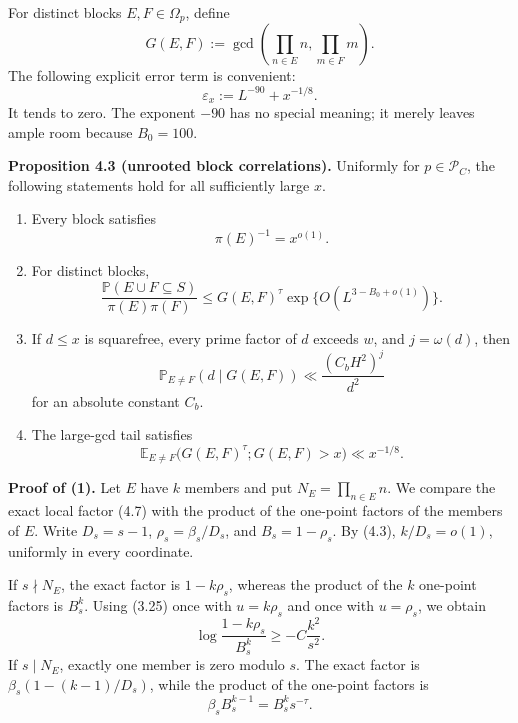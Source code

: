 \documentclass[10pt,letterpaper]{article}
\newcommand{\PP}{\mathbb{P}}
\newcommand{\EE}{\mathbb{E}}
\newcommand{\PC}{\mathcal{P}_C}
\begin{document}
For distinct blocks $E,F\in\Omega_p$, define
\begin{equation}
G(E,F):=\gcd\left(\prod_{n\in E}n,\prod_{m\in F}m\right).
\tag{4.8}
\end{equation}
The following explicit error term is convenient:
\begin{equation}
\varepsilon_x:=L^{-90}+x^{-1/8}.
\tag{4.9}
\end{equation}
It tends to zero. The exponent $-90$ has no special meaning; it merely leaves ample room because $B_0=100$.

\textbf{Proposition 4.3 (unrooted block correlations).} Uniformly for $p\in\PC$, the following statements hold for
all sufficiently large $x$.
\begin{enumerate}
\item Every block satisfies
\begin{equation}
\pi(E)^{-1}=x^{o(1)}.
\tag{4.10}
\end{equation}
\item For distinct blocks,
\begin{equation}
\frac{\PP(E\cup F\subseteq S)}{\pi(E)\pi(F)}
\le G(E,F)^\tau\exp\{O(L^{3-B_0+o(1)})\}.
\tag{4.11}
\end{equation}
\item If $d\le x$ is squarefree, every prime factor of $d$ exceeds $w$, and $j=\omega(d)$, then
\begin{equation}
\PP_{E\ne F}(d\mid G(E,F))\ll\frac{(C_bH^2)^j}{d^2}
\tag{4.12}
\end{equation}
for an absolute constant $C_b$.
\item The large-gcd tail satisfies
\begin{equation}
\EE_{E\ne F}\bigl(G(E,F)^\tau;G(E,F)>x\bigr)\ll x^{-1/8}.
\tag{4.13}
\end{equation}
\end{enumerate}
\textbf{Proof of (1).} Let $E$ have $k$ members and put $N_E=\prod_{n\in E}n$. We compare the exact local factor (4.7) with
the product of the one-point factors of the members of $E$. Write $D_s=s-1$, $\rho_s=\beta_s/D_s$, and $B_s=1-\rho_s$. By
(4.3), $k/D_s=o(1)$, uniformly in every coordinate.

If $s\nmid N_E$, the exact factor is $1-k\rho_s$, whereas the product of the $k$ one-point factors is $B_s^k$. Using (3.25) once
with $u=k\rho_s$ and once with $u=\rho_s$, we obtain
\begin{equation}
\log\frac{1-k\rho_s}{B_s^k}\ge-C\frac{k^2}{s^2}.
\tag{4.14}
\end{equation}
If $s\mid N_E$, exactly one member is zero modulo $s$. The exact factor is $\beta_s(1-(k-1)/D_s)$, while the product of
the one-point factors is
\[
\beta_sB_s^{k-1}=B_s^ks^{-\tau}.
\]
\end{document}
